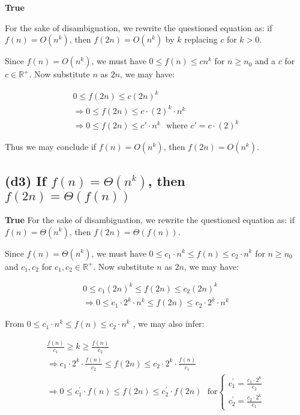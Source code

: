 \documentclass[12pt]{article}
\begin{document}
\textbf{True}

For the sake of disambiguation, we rewrite the questioned equation as: if $f(n) = O(n^k)$, then $f(2n) = O(n^k)$ by $k$ replacing $c$ for $k > 0$.


Since $f(n) = O(n^k)$, we must have $0 \leq f(n) \leq cn^k$ for $n \geq n_0$ and a $c$ for $c \in \mathbb{R^+}$. Now substitute $n$ as $2n$, we may have:

\begin{gather}
    0 \leq f(2n) \leq c(2n)^k \nonumber \\
    \Rightarrow 0 \leq f(2n) \leq c\cdot (2)^k \cdot n^k \\
    \Rightarrow 0 \leq f(2n) \leq c' \cdot n^k \ \ \ \text{where $c' = c\cdot (2)^k$}
\end{gather}

Thus we may conclude if $f(n) = O(n^k)$, then $f(2n) = O(n^k)$.

\subsection{(d3) If $f(n) = \Theta(n^k)$, then $f(2n) = \Theta(f(n))$}
\textbf{True}
For the sake of disambiguation, we rewrite the questioned equation as: if $f(n) = \Theta(n^k)$, then $f(2n) = \Theta(f(n))$.

Since $f(n) = \Theta(n^k)$, we must have $0 \leq c_1 \cdot n^k \leq f(n) \leq c_2 \cdot n^k$ for $n \geq n_0$ and $c_1, c_2$ for $c_1, c_2 \in \mathbb{R^+}$. Now substitute $n$ as $2n$, we may have:

\begin{gather}
    0 \leq c_1 (2n)^k \leq f(2n) \leq c_2 (2n)^k \nonumber \\
    \Rightarrow 0 \leq c_1 \cdot 2^k \cdot n^k \leq f(2n) \leq c_2 \cdot 2^k \cdot n^k
\end{gather}

From $0 \leq c_1 \cdot n^k \leq f(n) \leq c_2 \cdot n^k$ , we may also infer:

\begin{gather}
    \frac{f(n)}{c_1} \geq k \geq \frac{f(n)}{c_2} \\
    \Rightarrow c_1 \cdot 2^k \cdot \frac{f(n)}{c_2} \leq f(2n) \leq c_2 \cdot 2^k \cdot \frac{f(n)}{c_1} \\
    \Rightarrow 0\leq c^{'}_{1}\cdot f(n) \leq f(2n) \leq c^{'}_{2}\cdot f(2n) \ \ \ \text{for}\begin{cases}
                    c^{'}_{1} = \frac{c_1 \cdot 2^k}{c_2} \\
                    c^{'}_{2} = \frac{c_2 \cdot 2^k}{c_1}
                \end{cases}
\end{gather}
\end{document}
